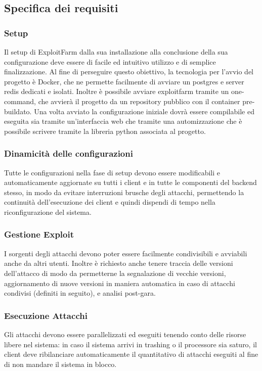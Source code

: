 \documentclass[11pt]{article}
\begin{document}
\subsection{Specifica dei requisiti}
\subsubsection{Setup}
Il setup di ExploitFarm dalla sua installazione alla conclusione della sua configurazione deve essere di facile ed intuitivo utilizzo e di semplice finalizzazione. Al fine di perseguire questo obiettivo, la tecnologia per l'avvio del progetto è Docker, che ne permette facilmente di avviare un postgres e server redis dedicati e isolati. Inoltre è possibile avviare exploitfarm tramite un one-command, che avvierà il progetto da un repository pubblico con il container pre-buildato. Una volta avviato la configurazione iniziale dovrà essere compilabile ed eseguita sia tramite un'interfaccia web che tramite una automizzazione che è possibile scrivere tramite la libreria python associata al progetto.
\subsubsection{Dinamicità delle configurazioni}
Tutte le configurazioni nella fase di setup devono essere modificabili e automaticamente aggiornate su tutti i client e in tutte le componenti del backend stesso, in modo da evitare interruzioni brusche degli attacchi, permettendo la continuità dell'esecuzione dei client e quindi dispendi di tempo nella riconfigurazione del sistema.
\subsubsection{Gestione Exploit}
I sorgenti degli attacchi devono poter essere facilmente condivisibili e avviabili anche da altri utenti. Inoltre è richiesto anche tenere traccia delle versioni dell'attacco di modo da permetterne la segnalazione di vecchie versioni, aggiornamento di nuove versioni in maniera automatica in caso di attacchi condivisi (definiti in seguito), e analisi post-gara.
\subsubsection{Esecuzione Attacchi}
Gli attacchi devono essere parallelizzati ed eseguiti tenendo conto delle risorse libere nel sistema: in caso il sistema arrivi in trashing o il processore sia saturo, il client deve ribilanciare automaticamente il quantitativo di attacchi eseguiti al fine di non mandare il sistema in blocco.
\end{document}
